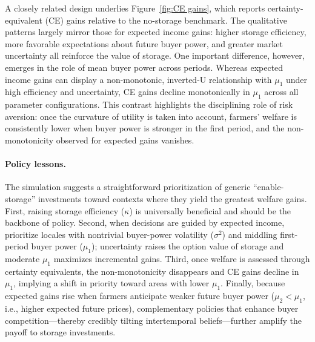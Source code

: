 \noindent 
A closely related design underlies Figure~\ref{fig:CE gains}, which reports certainty-equivalent (CE) gains relative to the no-storage benchmark. The qualitative patterns largely mirror those for expected income gains: higher storage efficiency, more favorable expectations about future buyer power, and greater market uncertainty all reinforce the value of storage. One important difference, however, emerges in the role of mean buyer power across periods. Whereas expected income gains can display a non-monotonic, inverted-U relationship with $\mu_1$ under high efficiency and uncertainty, CE gains decline monotonically in $\mu_1$ across all parameter configurations. This contrast highlights the disciplining role of risk aversion: once the curvature of utility is taken into account, farmers' welfare is consistently lower when buyer power is stronger in the first period, and the non-monotonicity observed for expected gains vanishes.

\paragraph{Policy lessons.} 
The simulation suggests a straightforward prioritization of generic ``enable-storage'' investments toward contexts where they yield the greatest welfare gains. First, raising storage efficiency ($\kappa$) is universally beneficial and should be the backbone of policy. Second, when decisions are guided by expected income, prioritize locales with nontrivial buyer-power volatility ($\sigma^2$) and middling first-period buyer power ($\mu_1$); uncertainty raises the option value of storage and moderate $\mu_1$ maximizes incremental gains. Third, once welfare is assessed through certainty equivalents, the non-monotonicity disappears and CE gains decline in $\mu_1$, implying a shift in priority toward areas with lower $\mu_1$. Finally, because expected gains rise when farmers anticipate weaker future buyer power ($\mu_2<\mu_1$, i.e., higher expected future prices), complementary policies that enhance buyer competition---thereby credibly tilting intertemporal beliefs---further amplify the payoff to storage investments.





